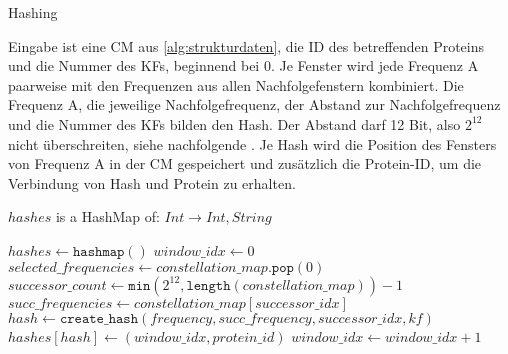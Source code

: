         \begin{algorithm}[H]
            \caption{Hashing}\label{alg:hashing}
            Eingabe ist eine \acl{CM} aus \autoref{alg:strukturdaten}, die ID des betreffenden Proteins und die Nummer des \acl{KF}s, beginnend bei 0. Je Fenster wird jede Frequenz A paarweise mit den Frequenzen aus allen Nachfolgefenstern kombiniert. Die Frequenz A, die jeweilige Nachfolgefrequenz, der Abstand zur Nachfolgefrequenz und die Nummer des \acl{KF}s bilden den Hash. Der Abstand darf 12 Bit, also $2^{12}$ nicht überschreiten, siehe nachfolgende \label{fig:hash}. Je Hash wird die Position des Fensters von Frequenz A in der \acl{CM} gespeichert und zusätzlich die Protein-ID, um die Verbindung von Hash und Protein zu erhalten.
            \begin{algorithmic}[1]
                \Ensure $hashes$ is a HashMap of: $Int \rightarrow Int, String$

                \State $hashes \gets \texttt{hashmap}()$
                \State $window\_idx \gets 0$
                \Repeat
                    \State $selected\_frequencies \gets constellation\_map.\texttt{pop}(0)$
                        \State $successor\_count \gets \texttt{min}(2^{12}, \texttt{length}(constellation\_map)) - 1$
                            \State $succ\_frequencies \gets constellation\_map[successor\_idx]$
                                \State $hash \gets \texttt{create\_hash}(frequency, succ\_frequency, successor\_idx, kf)$
                                \State $hashes[hash] \gets (window\_idx, protein\_id)$
                            \EndFor
                        \EndFor
                    \EndFor
                    \State $window\_idx \gets window\_idx + 1$
            \end{algorithmic}
        \end{algorithm}

